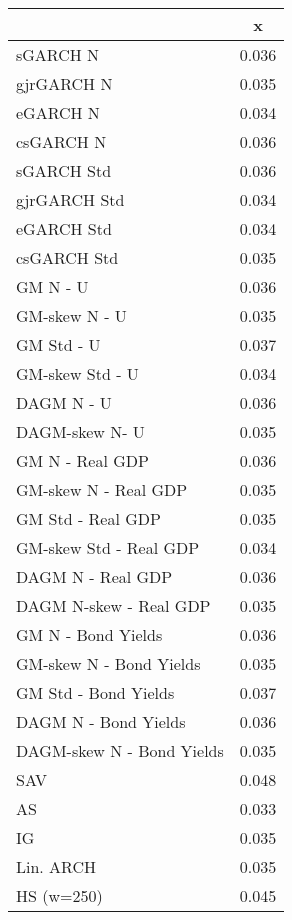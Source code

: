 \documentclass{article}
\begin{document}


\begin{table}[ht]
\centering
\begin{tabular}{lc}
  \hline
 & x \\ 
  \hline
sGARCH N & 0.036 \\ 
  gjrGARCH N & 0.035 \\ 
  eGARCH N & 0.034 \\ 
  csGARCH N & 0.036 \\ 
  sGARCH Std & 0.036 \\ 
  gjrGARCH Std & 0.034 \\ 
  eGARCH Std & 0.034 \\ 
  csGARCH Std & 0.035 \\ 
  GM N - U & 0.036 \\ 
  GM-skew N - U & 0.035 \\ 
  GM Std - U & 0.037 \\ 
  GM-skew Std - U & 0.034 \\ 
  DAGM N - U & 0.036 \\ 
  DAGM-skew  N- U & 0.035 \\ 
  GM N - Real GDP & 0.036 \\ 
  GM-skew N - Real GDP & 0.035 \\ 
  GM Std - Real GDP & 0.035 \\ 
  GM-skew Std - Real GDP & 0.034 \\ 
  DAGM N - Real GDP & 0.036 \\ 
  DAGM N-skew - Real GDP & 0.035 \\ 
  GM N - Bond Yields & 0.036 \\ 
  GM-skew N - Bond Yields & 0.035 \\ 
  GM Std - Bond Yields & 0.037 \\ 
  DAGM N - Bond Yields & 0.036 \\ 
  DAGM-skew N - Bond Yields & 0.035 \\ 
  SAV & 0.048 \\ 
  AS & 0.033 \\ 
  IG & 0.035 \\ 
  Lin. ARCH & 0.035 \\ 
  HS (w=250) & 0.045 \\ 
   \hline
\end{tabular}
\end{table}
\end{document}
